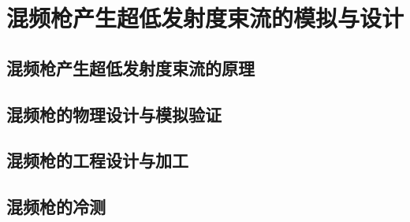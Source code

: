 \chapter{混频枪产生超低发射度束流的模拟与设计}
\label{chap:GA}

\section{混频枪产生超低发射度束流的原理}

\section{混频枪的物理设计与模拟验证}

\section{混频枪的工程设计与加工}

\section{混频枪的冷测}
